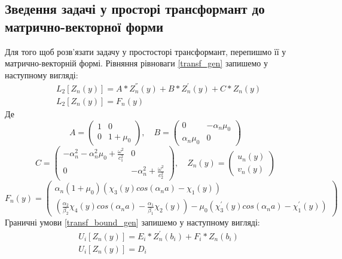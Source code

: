 \subsection{Зведення задачі у просторі трансформант до матрично-векторної форми}
Для того щоб розв'язати задачу у простосторі трансформант, перепишмо її у матрично-векторній формі.
Рівняння рівноваги \eqref{transf_gen} запишемо у наступному вигляді:
\begin{align}\label{transf_mat_gen}
    &L_2\left[ Z_n(y) \right] = A * Z_n^{''}(y) + B * Z_n^{'}(y) + C * Z_n(y) \nonumber \\
    &L_2\left[ Z_n(y) \right] = F_n(y)
\end{align}
Де
\begin{equation*}
    A = \begin{pmatrix}
        1 & 0 \\
        0 & 1 + \mu_0
    \end{pmatrix}, \quad
    B = \begin{pmatrix}
        0 & -\alpha_n \mu_0 \\
        \alpha_n \mu_0 & 0
    \end{pmatrix}
\end{equation*}
\begin{equation*}
    C = \begin{pmatrix}
        -\alpha_n^2 -\alpha_n^2 \mu_0 + \frac{\omega^2}{c_1^2} & 0 \\
        0 & -\alpha_n^2 + \frac{\omega^2}{c_2^2}
    \end{pmatrix}, \quad
    Z_n(y) = \begin{pmatrix}
        u_n(y) \\
        v_n(y)
    \end{pmatrix}
\end{equation*}
\begin{equation*}
    F_n(y) = \begin{pmatrix}
        \alpha_n(1 + \mu_0)(\chi_3(y) cos(\alpha_n a) - \chi_1(y)) \\
        (\frac{\alpha_2}{\beta_2}\chi_4(y) cos(\alpha_n a) - \frac{\alpha_1}{\beta_1}\chi_2(y)) - \mu_0 (\chi_3^{'}(y) cos(\alpha_n a) -\chi_1^{'}(y))
    \end{pmatrix}
\end{equation*}
Граничні умови \eqref{transf_bound_gen} запишемо у наступному вигляді:
\begin{align}\label{transf_bound_mat_gen}
    &U_i\left[ Z_n(y) \right] = E_i * Z_n^{'}(b_i) + F_i * Z_n(b_i) \nonumber \\
    &U_i\left[ Z_n(y) \right] = D_i
\end{align}
